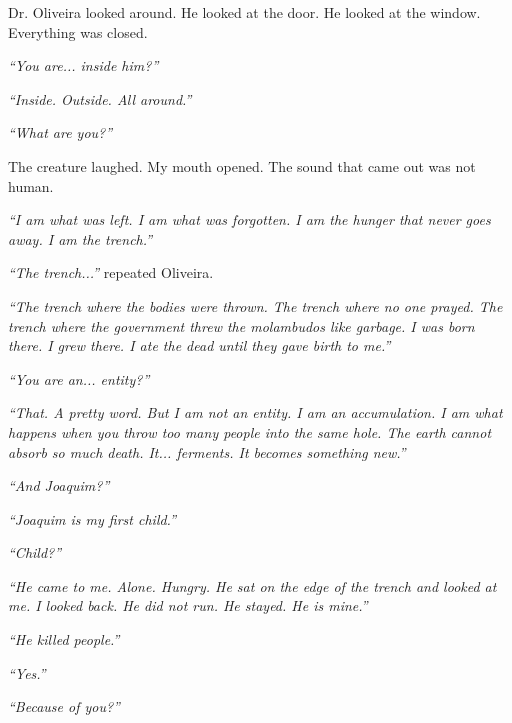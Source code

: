 \noindent Dr. Oliveira looked around. He looked at the door. He looked at the window. Everything was closed.

\noindent \textit{\textquotedblleft{}You are... inside him?\textquotedblright{}}

\noindent \textit{\textquotedblleft{}Inside. Outside. All around.\textquotedblright{}}

\noindent \textit{\textquotedblleft{}What are you?\textquotedblright{}}

\noindent The creature laughed. My mouth opened. The sound that came out was not human.

\noindent \textit{\textquotedblleft{}I am what was left. I am what was forgotten. I am the hunger that never goes away. I am the trench.\textquotedblright{}}

\noindent \textit{\textquotedblleft{}The trench...\textquotedblright{}} repeated Oliveira.

\noindent \textit{\textquotedblleft{}The trench where the bodies were thrown. The trench where no one prayed. The trench where the government threw the molambudos like garbage. I was born there. I grew there. I ate the dead until they gave birth to me.\textquotedblright{}}

\noindent \textit{\textquotedblleft{}You are an... entity?\textquotedblright{}}

\noindent \textit{\textquotedblleft{}That. A pretty word. But I am not an entity. I am an accumulation. I am what happens when you throw too many people into the same hole. The earth cannot absorb so much death. It... ferments. It becomes something new.\textquotedblright{}}

\noindent \textit{\textquotedblleft{}And Joaquim?\textquotedblright{}}

\noindent \textit{\textquotedblleft{}Joaquim is my first child.\textquotedblright{}}

\noindent \textit{\textquotedblleft{}Child?\textquotedblright{}}

\noindent \textit{\textquotedblleft{}He came to me. Alone. Hungry. He sat on the edge of the trench and looked at me. I looked back. He did not run. He stayed. He is mine.\textquotedblright{}}

\noindent \textit{\textquotedblleft{}He killed people.\textquotedblright{}}

\noindent \textit{\textquotedblleft{}Yes.\textquotedblright{}}

\noindent \textit{\textquotedblleft{}Because of you?\textquotedblright{}}

